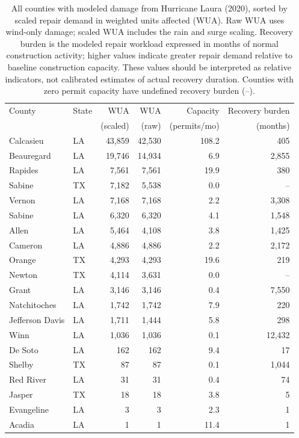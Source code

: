 \begin{table}[htb!]
\centering
\caption{All counties with modeled damage from Hurricane Laura (2020),
sorted by scaled repair demand in weighted units affected (WUA). Raw WUA
uses wind-only damage; scaled WUA includes the rain and surge scaling.
Recovery burden is the modeled repair workload expressed in months of
normal construction activity; higher values indicate greater repair demand
relative to baseline construction capacity. These values should be
interpreted as relative indicators, not calibrated estimates of actual
recovery duration. Counties with zero permit capacity have undefined
recovery burden (--).}
\label{tab:laura_counties_SI}
\begin{tabular}{llrrrr}
\hline
County & State & WUA & WUA & Capacity & Recovery burden \\
 & & (scaled) & (raw) & (permits/mo) & (months) \\
\hline
Calcasieu & LA & 43,859 & 42,530 & 108.2 & 405 \\
Beauregard & LA & 19,746 & 14,934 & 6.9 & 2,855 \\
Rapides & LA & 7,561 & 7,561 & 19.9 & 380 \\
Sabine & TX & 7,182 & 5,538 & 0.0 & -- \\
Vernon & LA & 7,168 & 7,168 & 2.2 & 3,308 \\
Sabine & LA & 6,320 & 6,320 & 4.1 & 1,548 \\
Allen & LA & 5,464 & 4,108 & 3.8 & 1,425 \\
Cameron & LA & 4,886 & 4,886 & 2.2 & 2,172 \\
Orange & TX & 4,293 & 4,293 & 19.6 & 219 \\
Newton & TX & 4,114 & 3,631 & 0.0 & -- \\
Grant & LA & 3,146 & 3,146 & 0.4 & 7,550 \\
Natchitoches & LA & 1,742 & 1,742 & 7.9 & 220 \\
Jefferson Davis & LA & 1,711 & 1,444 & 5.8 & 298 \\
Winn & LA & 1,036 & 1,036 & 0.1 & 12,432 \\
De Soto & LA & 162 & 162 & 9.4 & 17 \\
Shelby & TX & 87 & 87 & 0.1 & 1,044 \\
Red River & LA & 31 & 31 & 0.4 & 74 \\
Jasper & TX & 18 & 18 & 3.8 & 5 \\
Evangeline & LA & 3 & 3 & 2.3 & 1 \\
Acadia & LA & 1 & 1 & 11.4 & 1 \\
\hline
\end{tabular}
\end{table}
